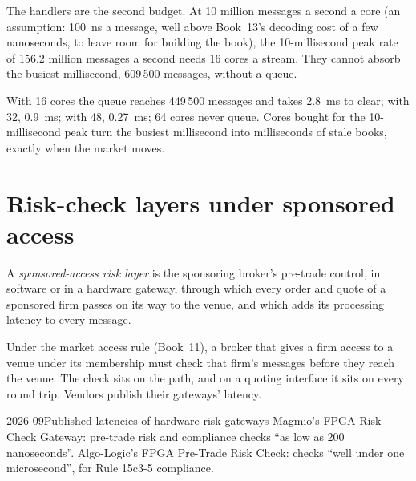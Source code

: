 The handlers are the second budget. At 10 million messages a second a core (an assumption: \qty{100}{\nano\second} a message, well above
Book~13's decoding cost of a few nanoseconds, to leave room for building the book), the 10-millisecond peak rate of 156.2 million messages a second
needs 16 cores a stream. They cannot absorb the busiest millisecond, 609\,500 messages, without a queue.

\label{lst:nw:equities-and-options-connectivity:backlog}

With 16 cores the queue reaches 449\,500 messages and takes \qty{2.8}{\milli\second} to clear; with 32, \qty{0.9}{\milli\second};
with 48, \qty{0.27}{\milli\second}; 64 cores never queue. Cores bought for the 10-millisecond peak turn the busiest millisecond
into milliseconds of stale books, exactly when the market moves.

\section{Risk-check layers under sponsored access}

\begin{definition}\label{def:nw:equities-and-options-connectivity:risk}
A \emph{sponsored-access risk layer} is the sponsoring broker's pre-trade control, in software
or in a hardware gateway, through which every order and quote of a sponsored firm passes on its way to the venue, and
which adds its processing latency to every message.
\end{definition}

Under the market access rule (Book~11), a broker that gives a firm access to a venue under its membership must check that
firm's messages before they reach the venue. The check sits on the path, and on a quoting interface it sits on every round
trip. Vendors publish their gateways' latency.

\begin{dated}{2026-09}{Published latencies of hardware risk gateways}\label{dat:nw:equities-and-options-connectivity:risk}
Magmio's FPGA Risk Check Gateway: pre-trade risk and compliance checks ``as low as 200 nanoseconds''. Algo-Logic's FPGA
Pre-Trade Risk Check: checks ``well under one microsecond'', for Rule 15c3-5 compliance.
\end{dated}

